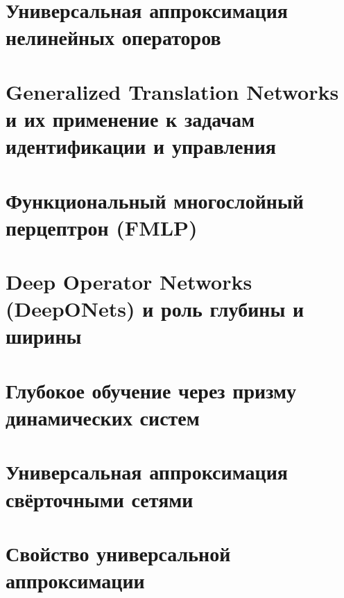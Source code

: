 \documentclass[titlepage, a4paper, 12pt]{article}
\theoremstyle{definition}
\theoremstyle{plain}
\theoremstyle{remark}
\begin{document}
\section{Универсальная аппроксимация нелинейных операторов}



\newpage

\section{Generalized Translation Networks и их применение к задачам идентификации и управления}


\newpage

\section{Функциональный многослойный перцептрон (FMLP)}


\newpage

\section{Deep Operator Networks (DeepONets) и роль глубины и ширины}


\newpage

\section{Глубокое обучение через призму динамических систем}

\newpage

\section{Универсальная аппроксимация свёрточными сетями}


\newpage

\section{Свойство универсальной аппроксимации}


\newpage



\end{document}
